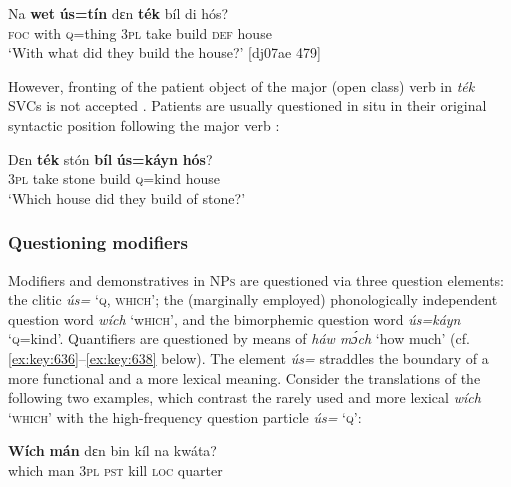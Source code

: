 \ea%
    \label{ex:key:611}
    \gll Na  \textbf{wet}    \textbf{ús=tín}  dɛn  \textbf{ték}  bíl    di  hós?\\
\textsc{foc}  with    \textsc{q}=thing  \textsc{3pl}  take  build  \textsc{def}  house\\

\glt ‘With what did they build the house?’ [dj07ae 479]
\z

However, fronting of the patient object of the major (open class) verb in \textit{ték} SVCs is not accepted . Patients are usually questioned in situ in their original syntactic position following the major verb :


\z


\ea%
    \label{ex:key:613}
    \gll Dɛn  \textbf{ték}  stón    \textbf{bíl}   \textbf{ús=káyn}  \textbf{hós}?\\
\textsc{3pl}  take  stone  build  \textsc{q}=kind  house\\

\glt ‘Which house did they build of stone?’
\z

\subsubsection{Questioning modifiers}

Modifiers and demonstratives in \textsc{NPs} are questioned via three question elements: the clitic \textit{ús=} ‘\textsc{q}, \textsc{which’}; the (marginally employed) phonologically independent question word \textit{wích} ‘w\textsc{hich’,} and the bimorphemic question word \textit{ús=káyn} ‘\textsc{q}=kind’. Quantifiers are questioned by means of \textit{háw mɔ́ch} ‘how much’ (cf. \ref{ex:key:636}–\ref{ex:key:638} below). The element \textit{ús=} straddles the boundary of a more functional and a more lexical meaning. Consider the translations of the following two examples, which contrast the rarely used and more lexical \textit{wích} ‘\textsc{which}’ with the high-frequency question particle \textit{ús=} ‘\textsc{q’}:


\ea%
    \label{ex:key:614}
    \gll \textbf{Wích}  \textbf{mán}  dɛn  bin  kíl  na  kwáta?\\
which  man    \textsc{3pl}  \textsc{pst}  kill  \textsc{loc}  quarter\\

